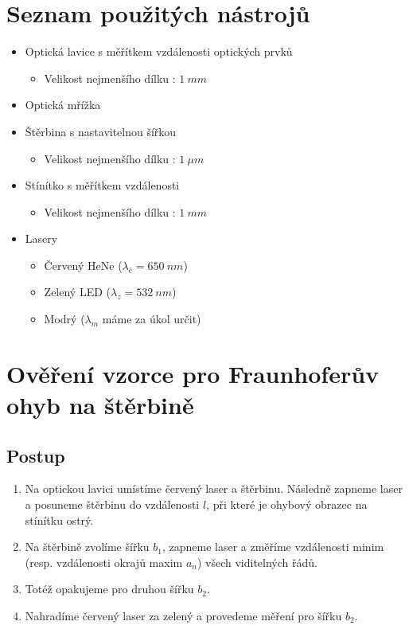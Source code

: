 \documentclass[a4paper,12pt]{article}
\begin{document}
\section{Seznam použitých nástrojů}
\begin{itemize}
    \item Optická lavice s měřítkem vzdálenosti optických prvků
        \begin{itemize}
            \item Velikost nejmenšího dílku : $1\ \unit{mm}$
        \end{itemize}
    \item Optická mřížka
    \item Štěrbina s nastavitelnou šířkou
        \begin{itemize}
            \item Velikost nejmenšího dílku : $1\ \unit{\mu m}$
        \end{itemize}
    \item Stínítko s měřítkem vzdálenosti
        \begin{itemize}
            \item Velikost nejmenšího dílku : $1\ \unit{mm}$
        \end{itemize}
    \item Lasery
        \begin{itemize}
            \item Červený HeNe ($\lambda_{č} = 650\ \unit{nm}$)
            \item Zelený LED ($\lambda_z = 532\ \unit{nm}$)
            \item Modrý ($\lambda_m$ máme za úkol určit)
        \end{itemize}
\end{itemize}

\newpage
\section{Ověření vzorce pro Fraunhoferův ohyb na štěrbině}

\subsection{Postup}
\begin{enumerate}
    \item Na optickou lavici umístíme červený laser a štěrbinu. Následně zapneme laser a posuneme štěrbinu do vzdálenosti $l$, při které je ohybový obrazec na stínítku ostrý.
    \item Na štěrbině zvolíme šířku $b_1$, zapneme laser a změříme vzdálenosti minim (resp. vzdálenosti okrajů maxim $a_n$) všech viditelných řádů.
    \item Totéž opakujeme pro druhou šířku $b_2$.
    \item Nahradíme červený laser za zelený a provedeme měření pro šířku $b_2$.
\end{enumerate}
\end{document}
